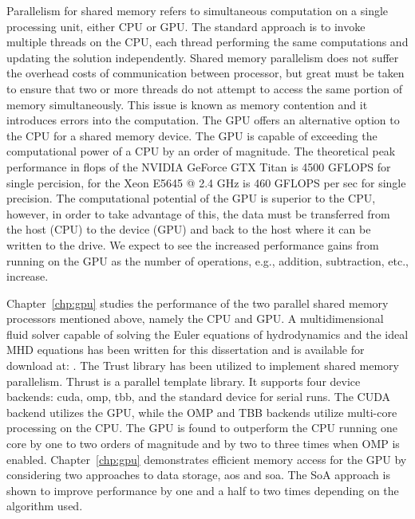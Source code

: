 Parallelism for shared memory refers to simultaneous computation on a single processing unit, either CPU or GPU.  The standard approach is to invoke multiple threads on the CPU, each thread performing the same computations and updating the solution independently.  Shared memory parallelism does not suffer the overhead costs of communication between processor, but great must be taken to ensure that two or more threads do not attempt to access the same portion of memory simultaneously.  This issue is known as memory contention and it introduces errors into the computation.  The GPU offers an alternative option to the CPU for a shared memory device.  The GPU is capable of exceeding the computational power of a CPU by an order of magnitude.  The theoretical peak performance in \gls{flops} of the NVIDIA GeForce GTX Titan is 4500 GFLOPS for single percision, for the Xeon E5645 @ 2.4 GHz is 460 GFLOPS per sec for single precision.  The computational potential of the GPU is superior to the CPU, however, in order to take advantage of this, the data must be transferred from the host (CPU) to the device (GPU) and back to the host where it can be written to the drive.  We expect to see the increased performance gains from running on the GPU as the number of operations, e.g., addition, subtraction, etc., increase.  

Chapter~\ref{chp:gpu} studies the performance of the two parallel shared memory processors mentioned above, namely the CPU and GPU.  A multidimensional fluid solver capable of solving the Euler equations of hydrodynamics and the ideal MHD equations has been written for this dissertation and is available for download at: \protect\gitrepo.  The Trust \citep{Thrust} library has been utilized to implement shared memory parallelism.  Thrust is a \cpp parallel template library.  It supports four device backends: \gls{cuda}, \gls{omp}, \gls{tbb}, and the standard \cpp device for serial runs.  The CUDA backend utilizes the GPU, while the OMP and TBB backends utilize multi-core processing on the CPU.  The GPU is found to outperform the CPU running one core by one to two orders of magnitude and by two to three times when OMP is enabled.  Chapter~\ref{chp:gpu} demonstrates efficient memory access for the GPU by considering two approaches to data storage, \gls{aos} and \gls{soa}.  The SoA approach is shown to improve performance by one and a half to two times depending on the algorithm used.  

              




